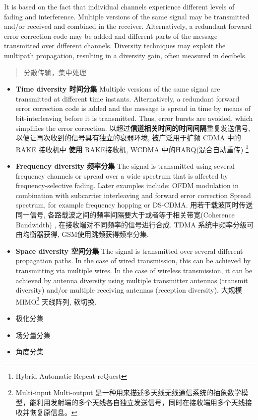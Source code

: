 \documentclass[a4paper]{report}
\begin{document}
 It is based on the fact that individual channels experience different levels of fading and interference. Multiple versions of the same signal may be transmitted and/or received and combined in the receiver. Alternatively, a redundant forward error correction code may be added and different parts of the message transmitted over different channels. Diversity techniques may exploit the multipath propagation, resulting in a diversity gain, often measured in decibels.
\begin{quotation}
	分散传输，集中处理
\end{quotation}
\begin{itemize}
	\item \textbf{Time diversity 时间分集} Multiple versions of the same signal are transmitted at different time instants. Alternatively, a redundant forward error correction code is added and the message is spread in time by means of bit-interleaving before it is transmitted. Thus, error bursts are avoided, which simplifies the error correction.
	\subitem 以超过\textbf{信道相关时间的时间间隔}重复发送信号, 以便让再次收到的信号具有独立的衰弱环境, 被广泛用于扩频 CDMA 中的 RAKE 接收机中 
	\subitem \textbf{使用} RAKE接收机, WCDMA 中的HARQ(混合自动重传) \footnote{Hybrid Automatic Repeat-reQuest}
	\item \textbf{Frequency diversity 频率分集} The signal is transmitted using several frequency channels or spread over a wide spectrum that is affected by frequency-selective fading. Later examples include:
	\subitem OFDM modulation in combination with subcarrier interleaving and forward error correction
	\subitem Spread spectrum, for example frequency hopping or DS-CDMA.
	\subitem 用若干载波同时传送同一信号, 各路载波之间的频率间隔要大于或者等于相关带宽(Coherence Bandwidth) , 在接收端对不同频率的信号进行合成. TDMA 系统中频率分级可由均衡器获得, GSM使用跳频获得频率分集. 
	\item \textbf{Space diversity 空间分集} The signal is transmitted over several different propagation paths. 
	\subitem In the case of wired transmission, this can be achieved by transmitting via multiple wires. 
	\subitem In the case of wireless transmission, it can be achieved by antenna diversity using multiple transmitter antennas (transmit diversity) and/or multiple receiving antennas (reception diversity). 
	\subitem 大规模 MIMO\footnote{Multi-input Multi-output 是一种用来描述多天线无线通信系统的抽象数学模型，能利用发射端的多个天线各自独立发送信号，同时在接收端用多个天线接收并恢复原信息。} 天线阵列, 软切换. 
	\item 极化分集
	\item 场分量分集
	\item 角度分集
\end{itemize}
\end{document}
